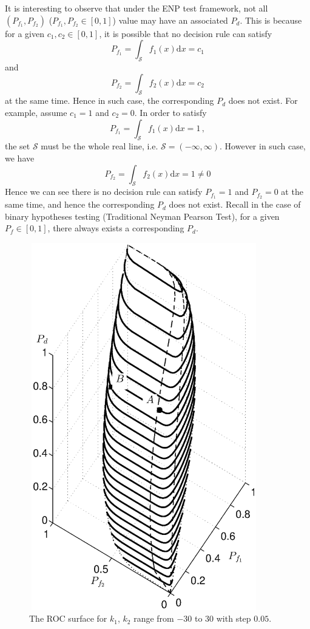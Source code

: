 It is interesting to observe that under the ENP test framework, not all $(P_{f_1}, P_{f_2})$  ($P_{f_1}, P_{f_2}\in [0, 1]$) value may have an associated $P_d$. This is because for a given $c_1, c_2 \in [0, 1]$, it is possible that no decision rule can satisfy
\[
  P_{f_1} = \int_{\mathcal{S}}f_1(x)\mathrm{d}x =  c_1
\]
and
\[
  P_{f_2} = \int_{\mathcal{S}}f_2(x)\mathrm{d}x = c_2
\]
at the same time. Hence in such case, the corresponding $P_d$ does not exist. 
For example, assume $c_1 = 1$ and $c_2 = 0$. In order to satisfy 
\[
  P_{f_1} = \int_{\mathcal{S}}f_1(x)\mathrm{d}x = 1\,,
\]
the set $\mathcal{S}$  must  be the whole real line, i.e. $\mathcal{S} = (-\infty, \infty)$. However in such case, we have
\[
  P_{f_2} = \int_{\mathcal{S}}f_2(x)\mathrm{d}x = 1 \neq 0
\]
Hence we can see there is no decision rule can satisfy $P_{f_1} = 1$ and $P_{f_2} = 0$ at the same time, and hence the corresponding $P_d$ does not exist.
Recall in the case of binary hypotheses testing (Traditional Neyman Pearson Test), for a given $P_f \in [0, 1]$, there always exists a corresponding $P_d$. 

\begin{figure}[!t]
\centering
\includegraphics[width = 10cm, height=16cm]{2/ex1.eps}
\caption{The ROC surface for $k_1$, $k_2$ range from $-30$ to $30$ with step $0.05$.}
\label{fig: 2.1}
\end{figure}

